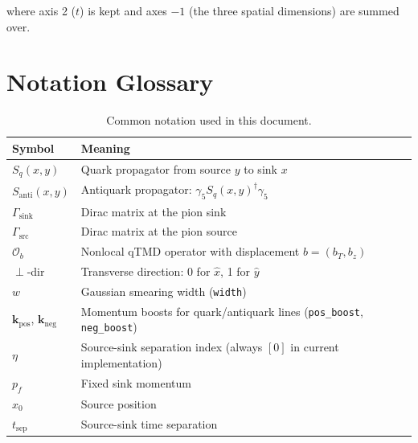 \documentclass[11pt]{article}
\begin{document}
where axis 2 ($t$) is kept and axes $-1$ (the three spatial dimensions) are summed over.

\section{Notation Glossary}

\begin{table}[H]
\centering
\caption{Common notation used in this document.}
\begin{tabular}{lp{}}
\toprule
\textbf{Symbol} & \textbf{Meaning} \\
\midrule
$S_q(x, y)$ & Quark propagator from source $y$ to sink $x$ \\
$S_{\text{anti}}(x, y)$ & Antiquark propagator: $\gamma_5 S_q(x, y)^\dagger \gamma_5$ \\
$\Gamma_{\text{sink}}$ & Dirac matrix at the pion sink \\
$\Gamma_{\text{src}}$ & Dirac matrix at the pion source \\
$\mathcal{O}_b$ & Nonlocal qTMD operator with displacement $b = (b_T, b_z)$ \\
$\perp$-dir & Transverse direction: 0 for $\hat{x}$, 1 for $\hat{y}$ \\
$w$ & Gaussian smearing width (\texttt{width}) \\
$\mathbf{k}_{\text{pos}}$, $\mathbf{k}_{\text{neg}}$ & Momentum boosts for quark/antiquark lines (\texttt{pos\_boost}, \texttt{neg\_boost}) \\
$\eta$ & Source-sink separation index (always $[0]$ in current implementation) \\
$p_f$ & Fixed sink momentum \\
$x_0$ & Source position \\
$t_{\text{sep}}$ & Source-sink time separation \\
\bottomrule
\end{tabular}
\end{table}
\end{document}
